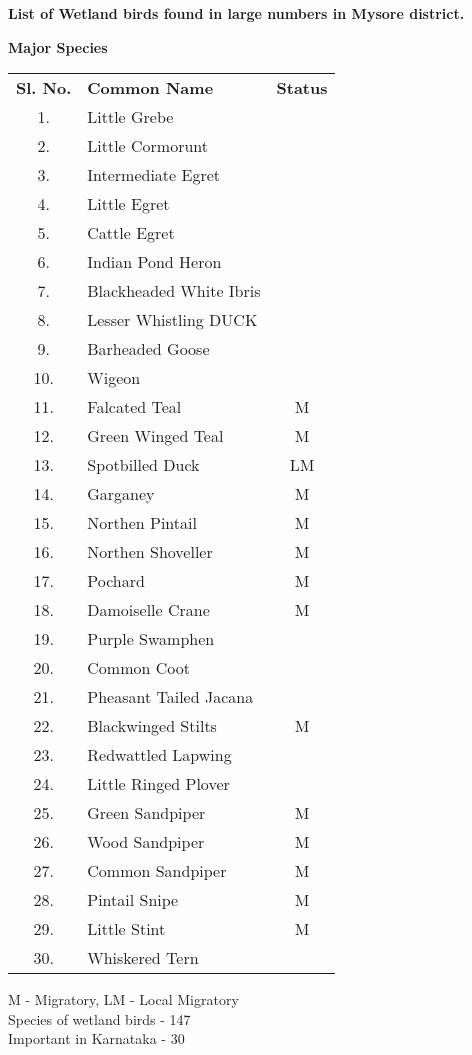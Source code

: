 \begin{center}
\smallskip
\textbf{List of Wetland birds found in large numbers in Mysore district.}

\smallskip
\textbf{Major Species}
\end{center}
{\renewcommand{\arraystretch}{1.1}
\begin{longtable}{cp{5cm}c}
\textbf{Sl. No.} & \textbf{Common Name} & \textbf{Status}\\
1. & Little Grebe &\\
2. & Little Cormorunt &\\
3. & Intermediate Egret& \\
4. & Little Egret &\\
5.	& Cattle Egret & \\ 
6.	& Indian Pond Heron & \\  
7.	& Blackheaded White Ibris & \\  
8.	& Lesser Whistling DUCK & \\  
9.	& Barheaded Goose & \\  
10.	& Wigeon & \\  
11.	& Falcated Teal  & M \\
12. & Green Winged Teal & M \\
13. & Spotbilled Duck & LM \\
14. & Garganey &M \\
15.	& Northen Pintail &M \\
16.	& Northen Shoveller & M \\
17.	& Pochard &M \\
18.	& Damoiselle Crane &M \\
19.	& Purple Swamphen &\\
20.	& Common Coot& \\
21.	& Pheasant Tailed Jacana &\\
22.	& Blackwinged Stilts &M \\
23.	& Redwattled Lapwing &\\
24.	& Little Ringed Plover& \\
25.	& Green Sandpiper& M \\
26.	& Wood Sandpiper &M \\
27.	& Common Sandpiper &M \\
28.	& Pintail Snipe &M \\
29.	& Little Stint &M \\
30.	& Whiskered Tern & 
\end{longtable}}

\begin{center}
M - Migratory, \qquad  LM - Local Migratory\\[0.1cm]
Species of wetland birds - 147 \\[0.1cm]
Important in Karnataka - 30 
\end{center}
